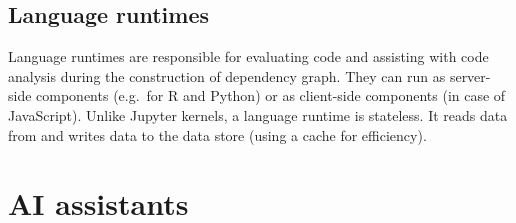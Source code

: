 \documentclass[sigplan,preprint,10pt]{acmart}\settopmatter{printfolios=true,printccs=false,printacmref=false}
\begin{document}
\subsection{Language runtimes}

Language runtimes are responsible for evaluating code and assisting with code analysis during
the construction of dependency graph. They can run as server-side components (e.g.~for R and Python)
or as client-side components (in case of JavaScript).
Unlike Jupyter kernels, a language runtime is stateless. It reads data from and writes data to
the data store (using a cache for efficiency).

\section{AI assistants}
\label{sec:ai}
\end{document}
